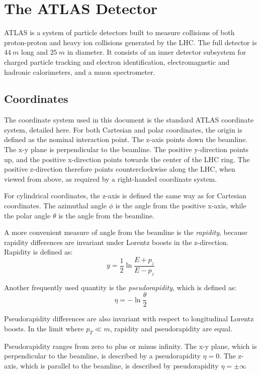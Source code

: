 \chapter{The ATLAS Detector}\label{ch:atlas}

ATLAS is a system of particle detectors built to measure collisions of both proton-proton and heavy ion collisions
generated by the LHC.\cite{atlas-detector-2008}
The full detector is $44~m$ long and $25~m$ in diameter.
It consists of an inner detector subsystem for charged particle tracking and electron identification,
electromagnetic and hadronic calorimeters, and a muon spectrometer.

\section{Coordinates}\label{sec:coordinates}
The coordinate system used in this document is the standard ATLAS coordinate system, detailed here.
For both Cartesian and polar coordinates, the origin is defined as the nominal interaction point.
The z-axis points down the beamline.
The x-y plane is perpendicular to the beamline.
The positive y-direction points up, and the positive x-direction points towards the center of the LHC ring.
The positive z-direction therefore points counterclockwise along the LHC, when viewed from above,
as required by a right-handed coordinate system.

For cylindrical coordinates, the z-axis is defined the same way as for
Cartesian coordinates. The azimuthal angle $\phi$ is the angle
from the positive x-axis, while the polar angle $\theta$ is the angle
from the beamline.

A more convenient measure of angle from the beamline is the
\textit{rapidity}, because rapidity differences are invariant under Lorentz boosts in the
z-direction.
Rapidity is defined as:
\begin{equation}
y = \frac{1}{2}\ln\frac{E+p_z}{E-p_z}
\end{equation}

Another frequently used quantity is the
\textit{pseudorapidity}, which is defined as:
\begin{equation}
\eta = -\ln\frac{\theta}{2}
\end{equation}

Pseudorapidity differences are also invariant with respect to
longitudinal Lorentz boosts. In the limit where $p_T \ll m$, rapidity and
pseudorapidity are equal.

Pseudorapidity ranges from zero to plus or minus infinity.
The x-y plane, which is perpendicular to the beamline, is described by a pseudorapidity $\eta=0$.
The z-axis, which is parallel to the beamline, is described by pseudorapidity $\eta=\pm\infty$

